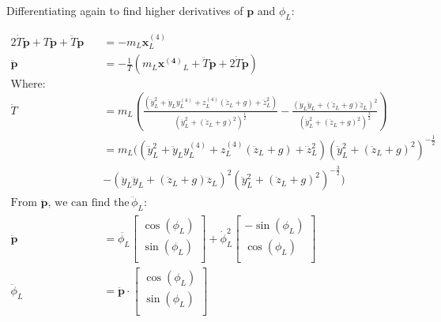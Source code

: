 \documentclass[11pt]{article}
\begin{document}
Differentiating again to find higher derivatives of $\mathbf{p}$ and $\phi_L$: 

\begin{align*}
2 \dot{T} \mathbf{\dot{p}} + T \mathbf{\ddot{p}} + \ddot{T} \mathbf{p} &= -m_L \mathbf{x}_L^{(4)} \\
\mathbf{\ddot{p}} &= - \frac{1}{T} ( m_L \mathbf{x^{(4)}}_L + \ddot{T} \mathbf{p} + 2 \dot{T} \mathbf{\dot{p}} ) \\
\text{Where:} & \\
\ddot{T} &= m_L \left( \frac{ ( \dddot{y}_L^2 + \ddot{y}_L y_L^{(4)} + {z}_L^{(4)} (\ddot{z}_L+g)  + \dddot{z}_L^2 ) } { (\ddot{y}_L^2 + ( \ddot{z}_L+g)^2)^{\frac{1}{2}} } - \frac{ (\ddot{y}_L \dddot{y}_L + (\ddot{z}_L+g) \dddot{z}_L)^2 } { ( \ddot{y}_L^2 + (\ddot{z}_L+g)^2 )^\frac{3}{2} } \right) \\
&= m_L ( ( \dddot{y}_L^2 + \ddot{y}_L y_L^{(4)} + {z}_L^{(4)} (\ddot{z}_L+g)  + \dddot{z}_L^2 ) (\ddot{y}_L^2 + ( \ddot{z}_L+g)^2)^{-\frac{1}{2}} \\
&- (\ddot{y}_L \dddot{y}_L + (\ddot{z}_L+g) \dddot{z}_L)^2 (\ddot{y}_L^2 + ( \ddot{z}_L+g)^2)^{-\frac{3}{2}} ) \\
\text{From $\mathbf{\ddot{p}}$, we can find the state $\ddot{\phi}_L$: } & \\
\mathbf{\ddot{p}} &= \ddot{\phi_L} 
\begin{bmatrix}
       \cos(\phi_L) \\
       \sin(\phi_L) \\
\end{bmatrix} 
+ \dot{\phi}_L^2 
\begin{bmatrix}
       -\sin(\phi_L) \\
       \cos(\phi_L) \\
\end{bmatrix} \\ 
\ddot{\phi}_L &= \mathbf{\ddot{p}} \cdot 
\begin{bmatrix}
       \cos(\phi_L) \\
       \sin(\phi_L) \\
\end{bmatrix} 
\end{align*}
\end{document}
